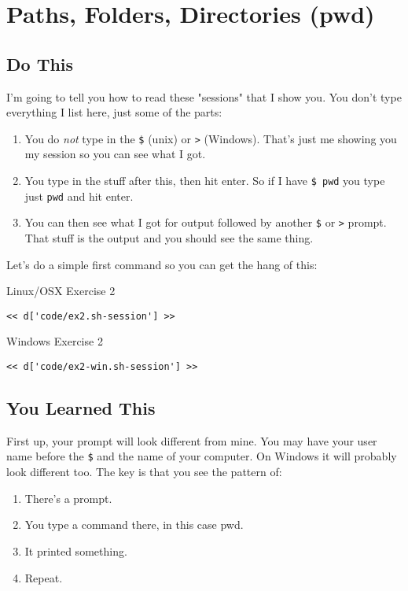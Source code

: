 \chapter{Paths, Folders, Directories (pwd)}

\section{Do This}

I'm going to tell you how to read these "sessions" that I show you.  You don't
type everything I list here, just some of the parts:

\begin{enumerate} 
\item You do \emph{not} type in the \verb|$| (unix) or
    \verb|>| (Windows).  That's just me showing you my session so you can see what
    I got.
\item You type in the stuff after this, then hit enter.  So if I have \verb|$ pwd| you type just \verb|pwd| and hit enter.
\item You can then see what I got for output followed by another \verb|$| or \verb|>| prompt.  That stuff is the output and you should see the same thing.
\end{enumerate}

Let's do a simple first command so you can get the hang of this:

\begin{code}{Linux/OSX Exercise 2}
\begin{Verbatim}
<< d['code/ex2.sh-session'] >>
\end{Verbatim}
\end{code}

\begin{code}{Windows Exercise 2}
\begin{Verbatim}
<< d['code/ex2-win.sh-session'] >>
\end{Verbatim}
\end{code}

\section{You Learned This}

First up, your prompt will look different from mine.  You may have your user
name before the \verb|$| and the name of your computer.  On Windows it will
probably look different too.  The key is that you see the pattern of:

\begin{enumerate}
\item There's a prompt.
\item You type a command there, in this case pwd.
\item It printed something.
\item Repeat.
\end{enumerate}

